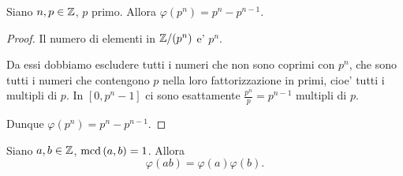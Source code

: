 \begin{proposition}
    Siano $n, p \in \mathbb{Z}$, $p$ primo. Allora $\varphi(p^n) = p^n - p^{n-1}$. 
\end{proposition}
\begin{proof}
    Il numero di elementi in $\mathbb{Z}/(p^n)$ e' $p^n$. 
    
    Da essi dobbiamo escludere tutti i numeri che non sono coprimi con $p^n$, che sono tutti i numeri che contengono $p$ nella loro fattorizzazione in primi, cioe' tutti i multipli di $p$.
    In $[0, p^n - 1]$ ci sono esattamente $\frac{p^n}{p} = p^{n-1}$ multipli di $p$.

    Dunque $\varphi(p^n) = p^n - p^{n-1}$.
\end{proof}

\begin{proposition}
    Siano $a, b \in \mathbb{Z}$, $\operatorname{mcd}\left(a, b\right) = 1$. Allora \begin{equation}
        \varphi(ab) = \varphi(a)\varphi(b).
    \end{equation}
\end{proposition}
